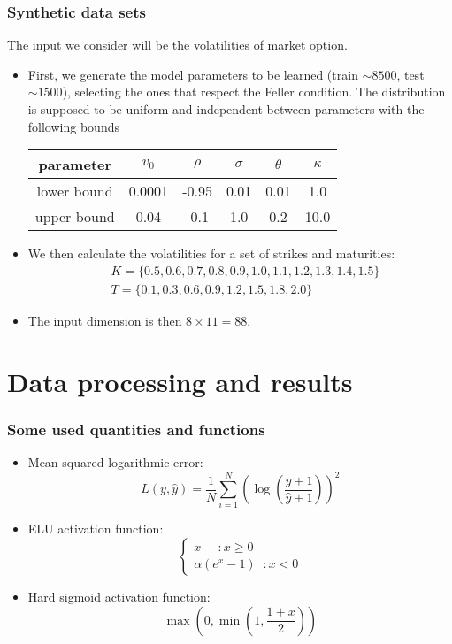 \documentclass{beamer}
\theoremstyle{plain}
\theoremstyle{definition}
\theoremstyle{remark}
\begin{document}
\begin{frame}
	\frametitle{Synthetic data sets}
	The input we consider will be the volatilities of market option.
	\begin{itemize}
		\item First, we generate the model parameters to be learned (train $\sim 8500$, test $\sim 1500$), selecting the ones that respect the Feller condition. The distribution is supposed to be uniform and independent between parameters with the following bounds
		\begin{table}
		\begin{tabular}{|c|c|c|c|c|c|}
			\hline 
			parameter & $v_0$ & $\rho$ & $\sigma$ & $\theta$ & $\kappa$ \\ 
			\hline 
			lower bound & 0.0001 & -0.95 & 0.01 & 0.01 & 1.0 \\ 
			\hline 
			upper bound & 0.04 & -0.1 & 1.0 & 0.2 & 10.0 \\ 
			\hline 
		\end{tabular} 
		\end{table}
		\item We then calculate the volatilities for a set of strikes and maturities:
		\begin{equation}
			\begin{split}
			& K = \{0.5, 0.6, 0.7, 0.8, 0.9, 1.0, 1.1, 1.2, 1.3, 1.4, 1.5\}\\
			& T = \{0.1, 0.3, 0.6, 0.9, 1.2, 1.5, 1.8, 2.0\}
			\end{split}
		\end{equation}
		\item The input dimension is then $8\times 11 =88$.
	\end{itemize}
\end{frame}

\section{Data processing and results}

\begin{frame}
	\frametitle{Some used quantities and functions}
	\begin{itemize}
		\item Mean squared logarithmic error:
		\begin{equation}
			L(y,\hat{y})=\frac{1}{N}\sum_{i = 1}^N{\left(\log\left(\frac{y+1}{\hat{y}+1}\right)\right)^2}
		\end{equation}
		\item ELU activation function:
		\begin{equation}
			\begin{cases}
			x \;\;\;\;\; : x\geq 0\\
			\alpha(e^x-1) \;\; : x < 0
			\end{cases}
		\end{equation}
		\item Hard sigmoid activation function:
		\begin{equation}
			\max\left(0, \min\left(1, \frac{1+x}{2}\right)\right)
		\end{equation}
	\end{itemize}
\end{frame}
\end{document}
